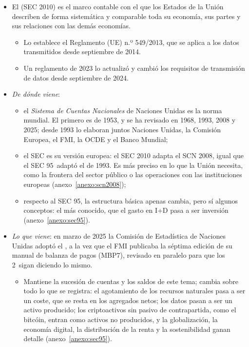 \documentclass[11pt]{article}
\begin{document}
\begin{itemize}
\item El  (SEC 2010) es el marco contable con el que los Estados de la Unión describen de forma sistemática y comparable toda su economía, sus partes y sus relaciones con las demás economías.
  \begin{itemize}
  \item Lo establece el Reglamento (UE) n.º 549/2013, que se aplica a los datos transmitidos desde septiembre de 2014\nocite{SEC2010}.
  \item Un reglamento de 2023 lo actualizó y cambió los requisitos de transmisión de datos desde septiembre de 2024\nocite{RegUE2023SEC2010}.
  \end{itemize}
\item \emph{De dónde viene}:
  \begin{itemize}
  \item el \emph{Sistema de Cuentas Nacionales} de Naciones Unidas es la norma mundial. El primero es de 1953, y se ha revisado en 1968, 1993, 2008 y 2025; desde 1993 lo elaboran juntos Naciones Unidas, la Comisión Europea, el FMI, la OCDE y el Banco Mundial\nocite{ONU2026HistoriaSCN,ONU2025SCN};
  \item el SEC es su versión europea: el SEC 2010 adapta el SCN 2008, igual que el SEC 95~adaptó el de 1993. Es más preciso en lo que la Unión necesita, como la frontera del sector público o las operaciones con las instituciones europeas (anexo~\ref{anexo:scn2008});
  \item respecto al SEC 95, la estructura básica apenas cambia, pero sí algunos conceptos: el más conocido, que el gasto en I+D pasa a ser inversión (anexo~\ref{anexo:sec95}).
  \end{itemize}
\item \emph{Lo que viene}: en marzo de 2025 la Comisión de Estadística de Naciones Unidas adoptó el , a la vez que el FMI publicaba la séptima edición de su manual de balanza de pagos (MBP7), revisado en paralelo para que los 2~sigan diciendo lo mismo\nocite{ONU2025SCN,FMI2025MBP7}.
  \begin{itemize}
  \item Mantiene la sucesión de cuentas y los saldos de este tema; cambia sobre todo lo que se registra: el agotamiento de los recursos naturales pasa a ser un coste, que se resta en los agregados netos; los datos pasan a ser un activo producido; los criptoactivos sin pasivo de contrapartida, como el bitcóin, entran como activos no producidos, y la globalización, la economía digital, la distribución de la renta y la sostenibilidad ganan detalle (anexo~\ref{anexo:sec95}).

\end{itemize}
\end{itemize}
\end{document}
